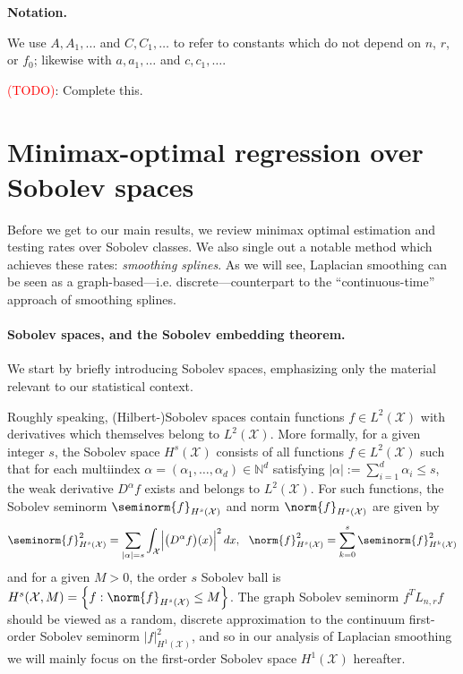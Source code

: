 \documentclass[twoside]{article}
\newcommand{\abs}[1]{\left \lvert #1 \right \rvert}
\newcommand{\set}[1]{\left\{#1\right\}}
\newcommand{\1}{\mathbf{1}}
\newcommand{\Lap}{L}
\newcommand{\Xset}{\mathcal{X}}
\newcommand{\Leb}{L}
\theoremstyle{definition}
\theoremstyle{remark}
\begin{document}
\textbf{Notation.}

We use $A,A_1, \ldots$ and $C,C_1, \ldots$ to refer to constants which do not depend on $n$, $r$, or $f_0$; likewise with $a, a_1,\ldots$ and $c, c_1,\ldots$.

\textcolor{red}{(TODO)}: Complete this.

\section{Minimax-optimal regression over Sobolev spaces}
\label{sec:minimax_optimal_regression_sobolev_spaces}

Before we get to our main results, we review minimax optimal estimation and testing rates over Sobolev classes. We also single out a notable method which achieves these rates: \emph{smoothing splines}. As we will see, Laplacian smoothing can be seen as a graph-based---i.e. discrete---counterpart to the ``continuous-time'' approach of smoothing splines. 

\paragraph{Sobolev spaces, and the Sobolev embedding theorem.} We start by briefly introducing Sobolev spaces, emphasizing only the material relevant to our statistical context. 

Roughly speaking, (Hilbert-)Sobolev spaces contain functions $f \in \Leb^2(\Xset)$ with derivatives which themselves belong to $\Leb^2(\Xset)$. More formally, for a given integer $s$, the Sobolev space $H^{s}(\Xset)$ consists of all functions $f \in \Leb^2(\Xset)$ such that for each multiindex $\alpha = (\alpha_1,\ldots,\alpha_d) \in \mathbb{N}^d$ satisfying $\abs{\alpha} := \sum_{i = 1}^{d} \alpha_i \leq s$, the weak derivative $D^{\alpha}f$ exists and belongs to $\Leb^2(\Xset)$. For such functions, the Sobolev seminorm $\seminorm{f}_{H^{s}(\Xset)}$ and norm $\norm{f}_{H^{s}(\Xset)}$ are given by 
\begin{equation*}
\seminorm{f}_{H^s(\Xset)}^2 = \sum_{\abs{\alpha} = s}\int_{\mathcal{X}} \Bigl|\bigl(D^{\alpha}f\bigr)(x)\Bigr|^2 \,dx, ~~ \norm{f}_{H^{s}(\Xset)}^2 = \sum_{k = 0}^{s} \seminorm{f}_{H^k(\Xset)}^2
\end{equation*}
and for a given $M > 0$, the order $s$ Sobolev ball is $H^s(\Xset, M) = \set{f: \norm{f}_{H^s(\Xset)} \leq M}$. The graph Sobolev seminorm $f^T \Lap_{n,r} f$ should be viewed as a random, discrete approximation to the continuum first-order Sobolev seminorm $|f|_{H^1(\Xset)}^2$, and so in our analysis of Laplacian smoothing we will mainly focus on the first-order Sobolev space $H^1(\Xset)$ hereafter.
\end{document}

